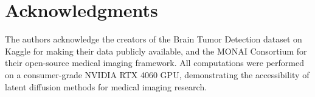 \section*{Acknowledgments}

The authors acknowledge the creators of the Brain Tumor Detection dataset on Kaggle for making their data publicly available, and the MONAI Consortium for their open-source medical imaging framework. All computations were performed on a consumer-grade NVIDIA RTX 4060 GPU, demonstrating the accessibility of latent diffusion methods for medical imaging research.





